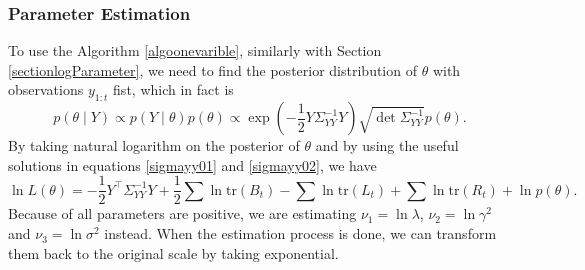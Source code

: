 \subsubsection*{Parameter Estimation}

To use the Algorithm \ref{algoonevarible}, similarly with Section \ref{sectionlogParameter}, we need to find the posterior distribution of $\theta$ with observations $y_{1:t}$ fist, which in fact is 
\begin{equation*}
p(\theta \mid Y) \propto p(Y\mid\theta)p(\theta) \propto \exp\left( -\frac{1}{2} Y \Sigma_{YY}^{-1} Y \right) \sqrt{\det \Sigma_{YY}^{-1}} p(\theta).
\end{equation*}
By taking natural logarithm on the posterior of $\theta$ and by using the useful solutions in equations \eqref{sigmayy01} and \eqref{sigmayy02}, we have 
\begin{equation}\label{simuOUlogL}
\ln L(\theta) = -\frac{1}{2}Y^\top\Sigma_{YY}^{-1}Y+\frac{1}{2}\sum\ln\mbox{tr}(B_t)-\sum\ln\mbox{tr}(L_t)+\sum\ln\mbox{tr}(R_t) + \ln p(\theta).
\end{equation}
Because of all parameters are positive, we are estimating $\nu_1=\ln\lambda$, $\nu_2=\ln\gamma^2$ and $\nu_3=\ln\sigma^2$ instead. When the estimation process is done, we can transform them back to the original scale by taking exponential. 

